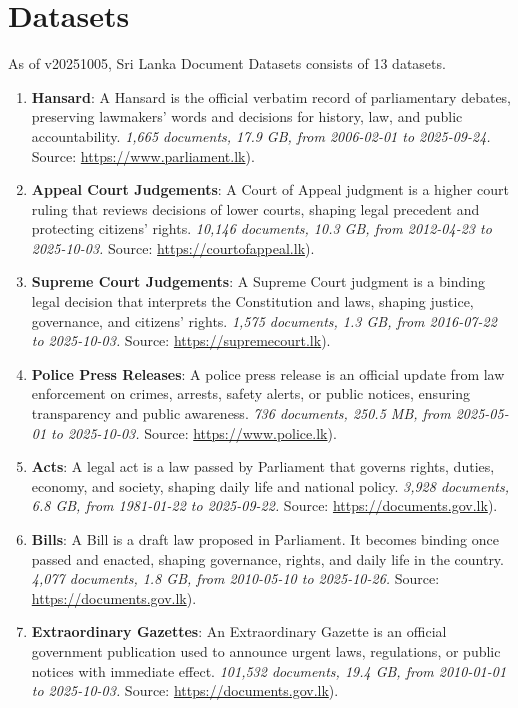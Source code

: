 \documentclass[10pt,a4paper]{article}%
\begin{document}
\section{Datasets}%
\label{sec:Datasets}%
As of v20251005, Sri Lanka Document Datasets consists of 13 datasets.%
\begin{enumerate}%
\item%
\textbf{Hansard}: A Hansard is the official verbatim record of parliamentary debates, preserving lawmakers’ words and decisions for history, law, and public accountability.\textit{ 1,665 documents, 17.9 GB, from 2006{-}02{-}01 to 2025{-}09{-}24.} Source: \href{https://www.parliament.lk}{https://www.parliament.lk}).%
\item%
\textbf{Appeal Court Judgements}: A Court of Appeal judgment is a higher court ruling that reviews decisions of lower courts, shaping legal precedent and protecting citizens’ rights.\textit{ 10,146 documents, 10.3 GB, from 2012{-}04{-}23 to 2025{-}10{-}03.} Source: \href{https://courtofappeal.lk}{https://courtofappeal.lk}).%
\item%
\textbf{Supreme Court Judgements}: A Supreme Court judgment is a binding legal decision that interprets the Constitution and laws, shaping justice, governance, and citizens’ rights.\textit{ 1,575 documents, 1.3 GB, from 2016{-}07{-}22 to 2025{-}10{-}03.} Source: \href{https://supremecourt.lk}{https://supremecourt.lk}).%
\item%
\textbf{Police Press Releases}: A police press release is an official update from law enforcement on crimes, arrests, safety alerts, or public notices, ensuring transparency and public awareness.\textit{ 736 documents, 250.5 MB, from 2025{-}05{-}01 to 2025{-}10{-}03.} Source: \href{https://www.police.lk}{https://www.police.lk}).%
\item%
\textbf{Acts}: A legal act is a law passed by Parliament that governs rights, duties, economy, and society, shaping daily life and national policy.\textit{ 3,928 documents, 6.8 GB, from 1981{-}01{-}22 to 2025{-}09{-}22.} Source: \href{https://documents.gov.lk}{https://documents.gov.lk}).%
\item%
\textbf{Bills}: A Bill is a draft law proposed in Parliament. It becomes binding once passed and enacted, shaping governance, rights, and daily life in the country.\textit{ 4,077 documents, 1.8 GB, from 2010{-}05{-}10 to 2025{-}10{-}26.} Source: \href{https://documents.gov.lk}{https://documents.gov.lk}).%
\item%
\textbf{Extraordinary Gazettes}: An Extraordinary Gazette is an official government publication used to announce urgent laws, regulations, or public notices with immediate effect.\textit{ 101,532 documents, 19.4 GB, from 2010{-}01{-}01 to 2025{-}10{-}03.} Source: \href{https://documents.gov.lk}{https://documents.gov.lk}).%

\end{enumerate}
\end{document}
